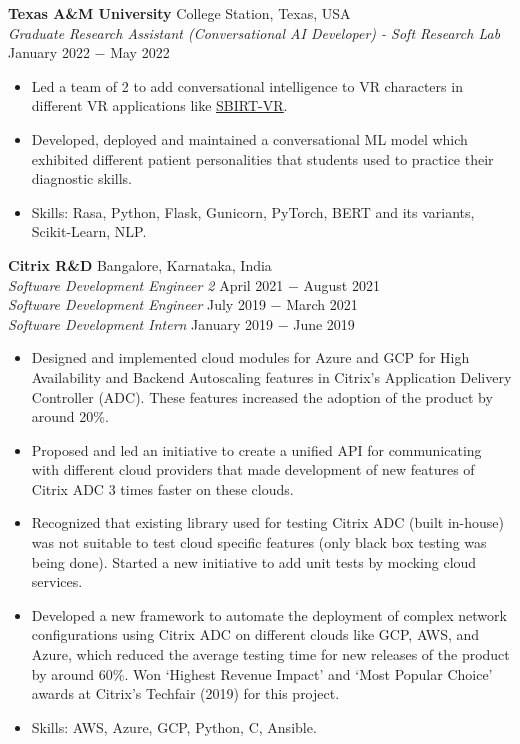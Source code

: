 \documentclass{article}
\begin{document}
\noindent \textbf{Texas A\&M University} \hfill College Station, Texas, USA\\
\textit{Graduate Research Assistant (Conversational AI Developer) - Soft Research Lab} \hfill January 2022 $-$ May 2022
\begin{itemize}[noitemsep,nolistsep,leftmargin=*]
\item {Led a team of 2 to add conversational intelligence to VR characters in different VR applications like \href{https://softinteraction.com/portfolio/sbirt-vr}{\underline{SBIRT-VR}}}.
\item {Developed, deployed and maintained a conversational ML model which exhibited different patient personalities that students used to practice their diagnostic skills.}
\item Skills: Rasa, Python, Flask, Gunicorn, PyTorch, BERT and its variants, Scikit-Learn, NLP.\\

\end{itemize}
\noindent \textbf{Citrix R\&D} \hfill Bangalore, Karnataka, India \\
\textit{Software Development Engineer 2} \hfill April 2021 $-$ August 2021 \\
\textit{Software Development Engineer} \hfill July 2019 $-$ March 2021 \\
\textit{Software Development Intern} \hfill January 2019 $-$ June 2019
\begin{itemize}[noitemsep,nolistsep,leftmargin=*]
\item {Designed and implemented cloud modules for Azure and GCP for High Availability and Backend Autoscaling features in Citrix's Application Delivery Controller (ADC). These features increased the adoption of the product by around 20\%.}
\item {Proposed and led an initiative to create a unified API for communicating with different cloud providers that made development of new features of Citrix ADC 3 times faster on these clouds.}
\item {Recognized that existing library used for testing Citrix ADC (built in-house) was not suitable to test cloud specific features (only black box testing was being done). Started a new initiative to add unit tests by mocking cloud services.}
\item {Developed a new framework to automate the deployment of complex network configurations using Citrix ADC on different clouds like GCP, AWS, and Azure, which reduced the average testing time for new releases of the product by around 60\%. Won `Highest Revenue Impact' and `Most Popular Choice' awards at Citrix's Techfair (2019) for this project.}
\item {Skills: AWS, Azure, GCP, Python, C, Ansible.\\}
\end{itemize}
\end{document}
